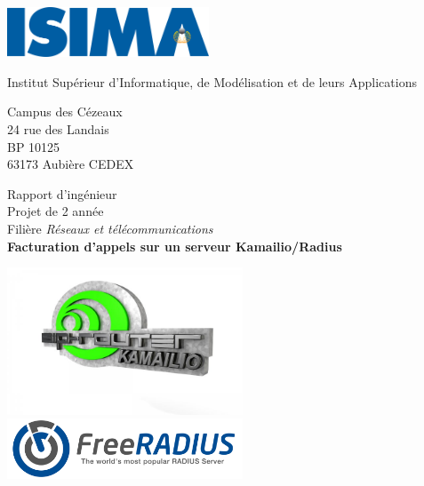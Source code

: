 \thispagestyle{empty}

\includegraphics[width=6cm]{images/isima.png}

\vspace{1cm}

\begin{minipage}{4cm}
\begin{flushleft}
	Institut Supérieur d’Informatique, de Modélisation et de leurs Applications
	
	\vspace{0.5cm}
	
	\small{ Campus des Cézeaux \\ 24 rue des Landais \\ BP 10125 \\ 63173 Aubière CEDEX }
\end{flushleft}
\end{minipage}

\vspace{3cm}

\begin{center}
	Rapport d’ingénieur \\
	Projet de 2{\ieme} année \\
	Filière {\em{Réseaux et télécommunications}} \\
	\Large{\textbf{Facturation d’appels sur un serveur Kamailio/Radius}}
\end{center}

\vspace{1cm}

\begin{center}
\includegraphics[width=7cm, valign=m]{images/logo-kamailio.jpg}
\includegraphics[width=7cm, valign=m]{images/logo-freeradius.png}
\end{center}

